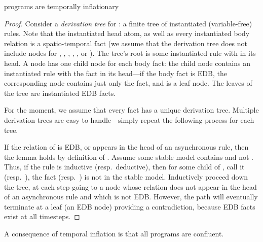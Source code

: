 \begin{lemma}
\label{lem:inflationary}
\slang programs are temporally inflationary
\end{lemma}
\begin{proof}
Consider a {\em derivation tree} for : a finite tree of instantiated (variable-free) rules.  Note that the instantiated head atom, as well as every instantiated body relation is a spatio-temporal fact (we assume that the derivation tree does not include nodes for , , , , \dedalus{<}, or ).  The tree's root is some instantiated rule with  in its head.  A node has one child node for each body fact: the child node contains an instantiated rule with the fact in its head---if the body fact is EDB, the corresponding node contains just only the fact, and is a leaf node.  The leaves of the tree are instantiated EDB facts.

For the moment, we assume that every fact has a unique derivation tree.  Multiple derivation trees are easy to handle---simply repeat the following process for each tree.

If the relation of  is EDB, or appears in the head of an asynchronous rule, then the lemma holds by definition of \slang.  Assume some stable model contains  and not .  Thus, if the rule is inductive (resp.\ deductive), then for some child of , call it  (resp.\ ), the fact  (resp.\ ) is not in the stable model.  Inductively proceed down the tree, at each step going to a node whose relation does not appear in the head of an asynchronous rule and which is not EDB.  However, the path will eventually terminate at a leaf (an EDB node) providing a contradiction, because EDB facts exist at all timesteps.
\end{proof}

A consequence of temporal inflation is that all \slang programs are confluent.

